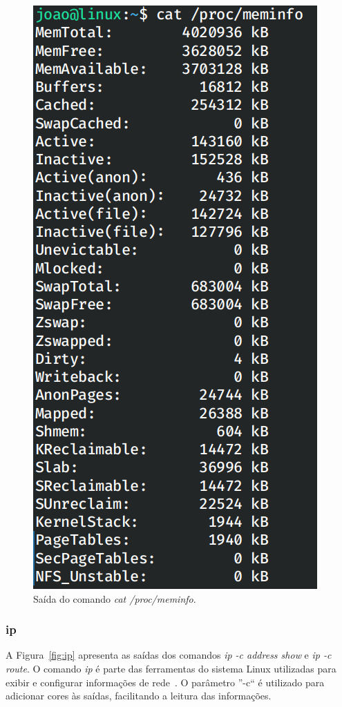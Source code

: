 \documentclass[
	12pt,				%
	oneside,   	        %
	a4paper,			%
	english,			%
	french,				%
	spanish,			%
	brazil,				%
	]{pacotes/abntex2}
\begin{document}
\begin{figure}[H]
  \centering
  \includegraphics[scale=0.5]{figuras/proc.png}
  \caption{Saída do comando \textit{cat /proc/meminfo}.}
  \label{fig:meminfo}
\end{figure}

\subsubsection{ip}

A Figura~\ref{fig:ip} apresenta as saídas dos comandos \textit{ip -c address show} e \textit{ip -c route}. O comando \textit{ip} é parte das ferramentas do sistema Linux utilizadas para exibir e configurar informações de rede~\cite{manIP}. O parâmetro ''-c`` é utilizado para adicionar cores às saídas, facilitando a leitura das informações.
\end{document}
